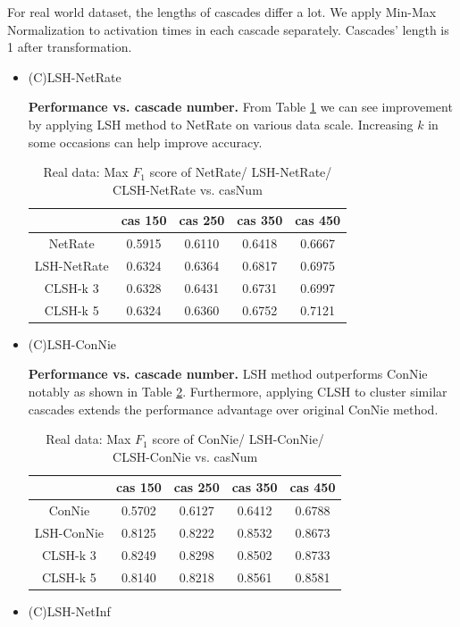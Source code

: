 For real world dataset, the lengths of cascades differ a lot. We apply Min-Max Normalization to activation times in each cascade separately. Cascades' length is 1 after transformation.
\begin{itemize}
\item (C)LSH-NetRate

\textbf{Performance vs. cascade number. }From Table \ref{tab:rwdLSHnetrateCASf1} we can see improvement by applying LSH method to NetRate on various data scale. Increasing $k$ in some occasions can help improve accuracy.
\begin{table}[H]
\caption{Real data: Max $F_1$ score of NetRate/  LSH-NetRate/ CLSH-NetRate vs. casNum}
\begin{tabular}{c|c|c|c|c}
 & cas 150 & cas 250 & cas 350 & cas 450 \\
 \hline
 NetRate & 0.5915 & 0.6110 & 0.6418 & 0.6667 \\
 LSH-NetRate & 0.6324 & 0.6364 & 0.6817 & 0.6975 \\
 CLSH-k 3 & 0.6328 & 0.6431 & 0.6731 & 0.6997 \\
 CLSH-k 5 & 0.6324 & 0.6360 & 0.6752 & 0.7121
\end{tabular}\label{tab:rwdLSHnetrateCASf1}
\end{table}
\item (C)LSH-ConNie

\textbf{Performance vs. cascade number.} LSH method outperforms ConNie notably as shown in Table \ref{tab:rwdLSHconnieCASf1}. Furthermore, applying CLSH to cluster similar cascades extends the performance advantage over original ConNie method.
\begin{table}[H]
\caption{Real data: Max $F_1$ score of ConNie/  LSH-ConNie/ CLSH-ConNie vs. casNum}
\begin{tabular}{c|c|c|c|c}
 & cas 150 & cas 250 & cas 350 & cas 450 \\
 \hline
 ConNie & 0.5702 & 0.6127 & 0.6412 & 0.6788 \\
 LSH-ConNie & 0.8125 & 0.8222 & 0.8532 & 0.8673 \\
 CLSH-k 3 & 0.8249 & 0.8298 & 0.8502 & 0.8733 \\
 CLSH-k 5 & 0.8140 & 0.8218 & 0.8561 & 0.8581
\end{tabular}\label{tab:rwdLSHconnieCASf1}
\end{table}
\item (C)LSH-NetInf


\end{itemize}

